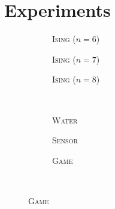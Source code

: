 \section{Experiments}
\setlength{}
\setlength{}
\renewcommand{\subflen}{0.328\textwidth}
\newcommand{\scspacey}{-0.5em}
\newcommand{\scspacex}{0.2em}
\begin{figure}[t!]
  \begin{subfigure}[b]{\subflen}
    \centering
    
    \vspace{\scspacey}
    \caption{\hspace{\scspacex}\textsc{Ising} ($n = 6$)}
    \label{fig:ising6}
  \end{subfigure}
  \begin{subfigure}[b]{\subflen}
    
    \vspace{\scspacey}
    \caption{\hspace{\scspacex}\textsc{Ising} ($n = 7$)}
    \label{fig:ising7}
  \end{subfigure}
  \begin{subfigure}[b]{\subflen}
    
    \vspace{\scspacey}
    \caption{\hspace{\scspacex}\textsc{Ising} ($n = 8$)}
    \label{fig:ising8}
  \end{subfigure}\\[0.8em]
  \begin{subfigure}[b]{\subflen}
    \centering
    
    \vspace{\scspacey}
    \caption{\hspace{\scspacex}\textsc{Water}}
    \label{fig:water1}
  \end{subfigure}
  \begin{subfigure}[b]{\subflen}
    
    \vspace{\scspacey}
    \caption{\hspace{\scspacex}\textsc{Sensor}}
    \label{fig:berkeley1}
  \end{subfigure}
  \begin{subfigure}[b]{\subflen}
    
    \vspace{\scspacey}
    \caption{\hspace{\scspacex}\textsc{Game}}
    \label{fig:hots1}
  \end{subfigure}\\[0.8em]

\end{figure}
